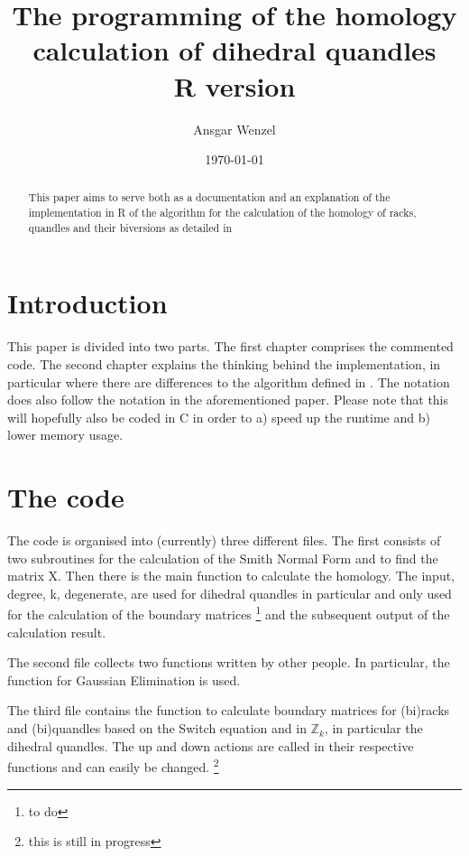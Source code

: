 \documentclass[11pt]{amsart}
\title{The programming of the homology calculation of dihedral quandles \\ R version}
\author{Ansgar Wenzel}
\date{\today}                                           %
\begin{document}
\begin{abstract}
This paper aims to serve both as a documentation and an explanation of the implementation in R of the algorithm for the calculation of the homology of racks, quandles and their biversions as detailed in \cite{Fenn1}
\end{abstract}
\maketitle
\section{Introduction}
This paper is divided into two parts. The first chapter comprises the commented code. The second chapter explains the thinking behind the implementation, in particular where there are differences to the algorithm defined in \cite{Fenn1}. The notation does also follow the notation in the aforementioned paper. Please note that this will hopefully also be coded in C in order to a) speed up the runtime and b) lower memory usage.
\section{The code}
The code is organised into (currently) three different files. The first consists of two subroutines for the calculation of the Smith Normal Form and to find the matrix X. Then there is the main function to calculate the homology. The input, degree, k, degenerate, are used for dihedral quandles in particular and only used for the calculation of the boundary matrices \footnote{to do} and the subsequent output of the calculation result.

The second file collects two functions written by other people. In particular, the function for Gaussian Elimination is used.

The third file contains the function to calculate boundary matrices for (bi)racks and (bi)quandles based on the Switch equation and in $\mathbb{Z}_k$, in particular the dihedral quandles. The up and down actions are called in their respective functions and can easily be changed. \footnote{this is still in progress}

\end{document}
